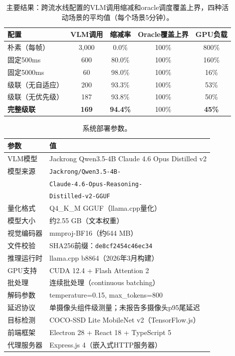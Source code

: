 \documentclass[a4paper,10pt]{ctexart}
\begin{document}
\begin{table}[t]
\centering
\caption{主要结果：跨流水线配置的VLM调用缩减和oracle调度覆盖上界，四种活动场景的平均值（每个场景5分钟）。}
\label{tab:main}
\small
\begin{tabular}{lcccc}
\toprule
配置 & VLM调用 & 缩减率 & Oracle覆盖上界 & GPU负载 \\
\midrule
朴素（每帧） & 3,000 & 0.0\% & 100\% & 800\% \\
固定500ms & 600 & 80.0\% & 100\% & 160\% \\
固定5000ms & 60 & 98.0\% & 100\% & 16\% \\
级联（无自适应） & 200 & 93.3\% & 100\% & 53\% \\
级联（无优先级） & 187 & 93.8\% & 100\% & 50\% \\
\textbf{完整级联} & \textbf{169} & \textbf{94.4\%} & 100\% & \textbf{45\%} \\
\bottomrule
\end{tabular}
\end{table}

\begin{table}[t]
\centering
\caption{系统部署参数。}
\label{tab:deployment}
\small
\begin{tabular}{p{3.0cm}p{10.5cm}}
\toprule
参数 & 值 \\
\midrule
VLM模型 & Jackrong Qwen3.5-4B Claude 4.6 Opus Distilled v2 \\
模型来源 & \texttt{Jackrong/Qwen3.5-4B-}\\
& \texttt{Claude-4.6-Opus-Reasoning-}\\
& \texttt{Distilled-v2-GGUF} \\
量化格式 & Q4\_K\_M GGUF（llama.cpp量化） \\
模型大小 & 约2.55 GB（文本权重） \\
视觉编码器 & mmproj-BF16（约644 MB） \\
文件校验 & SHA256前缀：\texttt{de8cf2454c46ec34} \\
推理运行时 & llama.cpp b8864（2026年3月构建） \\
GPU支持 & CUDA 12.4 + Flash Attention 2 \\
批处理 & 连续批处理（continuous batching） \\
解码参数 & temperature=0.15, max\_tokens=800 \\
延迟协议 & 单摄像头组件级测量；未报告多摄像头p95尾延迟 \\
目标检测 & COCO-SSD Lite MobileNet v2（TensorFlow.js） \\
前端框架 & Electron 28 + React 18 + TypeScript 5 \\
代理服务器 & Express.js 4（嵌入式HTTP服务器） \\
\bottomrule
\end{tabular}
\end{table}
\end{document}
